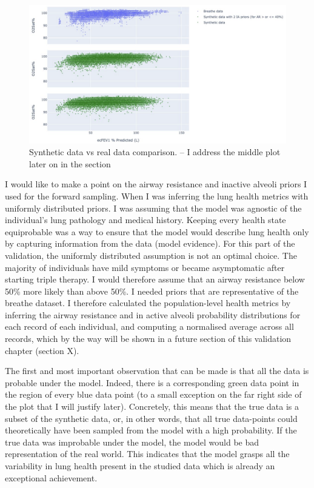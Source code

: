 \begin{figure}[!h]
    \centering
    \includegraphics[width=120mm]{Chapter1/Figs/synthetic_data.png}
    \caption{Synthetic data vs real data comparison. -- I address the middle plot later on in the section}
    \label{fig:synthetic_data}
\end{figure}

I would like to make a point on the airway resistance and inactive alveoli priors I used for the forward sampling. When I was inferring the lung health metrics with uniformly distributed priors. I was assuming that the model was agnostic of the individual's lung pathology and medical history. Keeping every health state equiprobable was a way to ensure that the model would describe lung health only by capturing information from the data (model evidence).
For this part of the validation, the uniformly distributed assumption is not an optimal choice. The majority of individuals have mild symptoms or became asymptomatic after starting triple therapy. I would therefore assume that an airway resistance below 50\% more likely than above 50\%. I needed priors that are representative of the breathe dataset. I therefore calculated the population-level health metrics by inferring the airway resistance and in active alveoli probability distributions for each record of each individual, and computing a normalised average across all records, which by the way will be shown in a future section of this validation chapter (section X).

The first and most important observation that can be made is that all the data is probable under the model. Indeed, there is a corresponding green data point in the region of every blue data point (to a small exception on the far right side of the plot that I will justify later). Concretely, this means that the true data is a subset of the synthetic data, or, in other words, that all true data-points could theoretically have been sampled from the model with a high probability. If the true data was improbable under the model, the model would be bad representation of the real world. This indicates that the model grasps all the variability in lung health present in the studied data which is already an exceptional achievement.

